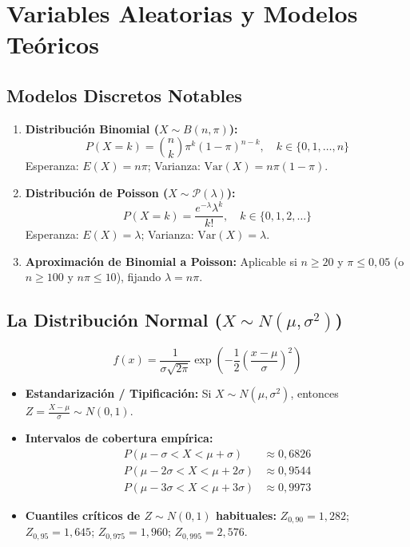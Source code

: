 \documentclass[11pt,a4paper]{report}
\theoremstyle{definition}
\begin{document}
\newpage
\chapter{Variables Aleatorias y Modelos Teóricos}

\section{Modelos Discretos Notables}
\begin{enumerate}[leftmargin=*]
    \item \textbf{Distribución Binomial ($X \sim B(n, \pi)$):}
    \begin{equation}
    P(X = k) = \binom{n}{k} \pi^k (1 - \pi)^{n-k}, \quad k \in \{0, 1, \dots, n\}
    \end{equation}
    Esperanza: $E(X) = n\pi$; Varianza: $\text{Var}(X) = n\pi(1-\pi)$.
    \item \textbf{Distribución de Poisson ($X \sim \mathcal{P}(\lambda)$):}
    \begin{equation}
    P(X = k) = \frac{e^{-\lambda} \lambda^k}{k!}, \quad k \in \{0, 1, 2, \dots\}
    \end{equation}
    Esperanza: $E(X) = \lambda$; Varianza: $\text{Var}(X) = \lambda$.
    \item \textbf{Aproximación de Binomial a Poisson:} Aplicable si $n \ge 20$ y $\pi \le 0{,}05$ (o $n \ge 100$ y $n\pi \le 10$), fijando $\lambda = n\pi$.
\end{enumerate}

\section{La Distribución Normal ($X \sim N(\mu, \sigma^2)$)}
\begin{equation}
f(x) = \frac{1}{\sigma \sqrt{2\pi}} \exp\left( -\frac{1}{2}\left(\frac{x - \mu}{\sigma}\right)^2 \right)
\end{equation}
\begin{itemize}[leftmargin=*]
    \item \textbf{Estandarización / Tipificación:} Si $X \sim N(\mu, \sigma^2)$, entonces $Z = \frac{X - \mu}{\sigma} \sim N(0, 1)$.
    \item \textbf{Intervalos de cobertura empírica:}
    \begin{align}
    P(\mu - \sigma < X < \mu + \sigma) &\approx 0{,}6826 \\
    P(\mu - 2\sigma < X < \mu + 2\sigma) &\approx 0{,}9544 \\
    P(\mu - 3\sigma < X < \mu + 3\sigma) &\approx 0{,}9973
    \end{align}
    \item \textbf{Cuantiles críticos de $Z \sim N(0,1)$ habituales:}
    $Z_{0{,}90} = 1{,}282$; $Z_{0{,}95} = 1{,}645$; $Z_{0{,}975} = 1{,}960$; $Z_{0{,}995} = 2{,}576$.
\end{itemize}
\end{document}
